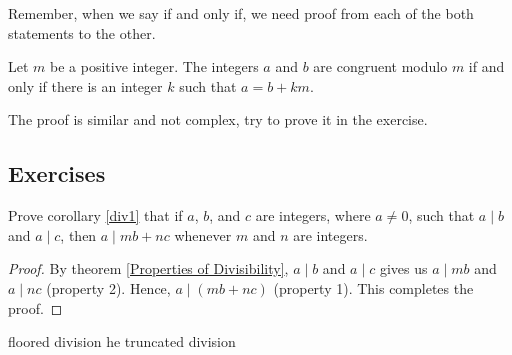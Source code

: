     \begin{remark}
        Remember, when we say if and only if, we need proof from each of the both statements to the other.
    \end{remark}
    \begin{theorem}\label{mod2}
        Let $m$ be a positive integer. The integers $a$ and $b$ are congruent modulo $m$ if and only if there is an integer $k$ such that $a = b + km$.
    \end{theorem}
    The proof is similar and not complex, try to prove it in the exercise.







    \subsection{Exercises}
    \begin{exercise}
        Prove corollary \ref{div1} that if $a$, $b$, and $c$ are integers, where $a\neq 0$, such that $a\mid b$ and $a\mid c$, then $a\mid mb + nc$ whenever $m$ and $n$ are integers.
    \end{exercise}
    \begin{proof}
        By theorem \ref{Properties of Divisibility}, $a\mid b$ and $a\mid c$ gives us $a\mid mb$
        and $a\mid nc$ (property 2). Hence, $a\mid (mb+nc)$ (property 1). This completes the proof.
    \end{proof}
    
    \begin{exercise}
        floored division he truncated division
    \end{exercise}

